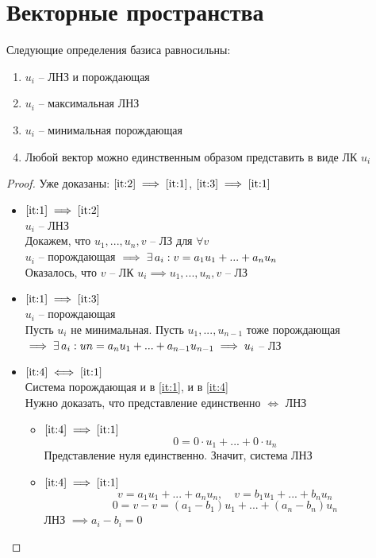 \chapter{Векторные пространства}

\begin{theorem}
	Следующие определения базиса равносильны:
    \begin{enumerate}
        \item \label{it:1} $u_i$ -- ЛНЗ и порождающая
        \item \label{it:2} $u_i$ -- максимальная ЛНЗ
        \item \label{it:3} $u_i$ -- минимальная порождающая
        \item \label{it:4} Любой вектор можно единственным образом представить в виде ЛК $u_i$
    \end{enumerate}
\end{theorem}

\begin{proof}
    Уже доказаны: $ \ref{it:2} \implies \ref{it:1} $, $ \ref{it:3} \implies \ref{it:1} $
    \begin{itemize}
        \item $ \ref{it:1} \implies \ref{it:2} $ \\
        $ u_i $ -- ЛНЗ \\
        Докажем, что $ u_1, ..., u_n, v $ -- ЛЗ для $ \forall v $ \\
        $ u_i $ -- порождающая $ \implies \exists\, a_i : v = a_1u_1 + ... + a_nu_n $ \\
        Оказалось, что $v$ -- ЛК $u_i \implies u_1, ..., u_n, v $ -- ЛЗ
        \item $ \ref{it:1} \implies \ref{it:3} $ \\
        $ u_i $ -- порождающая \\
        Пусть $ u_i $ не минимальная. Пусть $ u_1, ..., u_{n - 1} $ тоже порождающая $ \implies \exists\, a_i : un = a_nu_1 + ... + a_{n - 1}u_{n - 1} \implies u_i $ -- ЛЗ
        \item $ \ref{it:4} \iff \ref{it:1} $ \\
        Система порождающая и в \ref{it:1}, и в \ref{it:4} \\
        Нужно доказать, что представление единственно $ \iff $ ЛНЗ
        \begin{itemize}
            \item $ \ref{it:4} \implies \ref{it:1} $
            $$ 0 = 0 \cdot u_1 + ... + 0 \cdot u_n $$
            Представление нуля единственно. Значит, система ЛНЗ
            \item $ \ref{it:4} \implies \ref{it:1} $
            $$ v = a_1u_1 + ... + a_nu_n, \quad v = b_1u_1 + ... + b_nu_n $$
            $$ 0 = v - v = (a_1 - b_1)u_1 + ... + (a_n - b_n)u_n $$
            ЛНЗ $ \implies a_i - b_i = 0 $
        \end{itemize}
    \end{itemize}
\end{proof}

